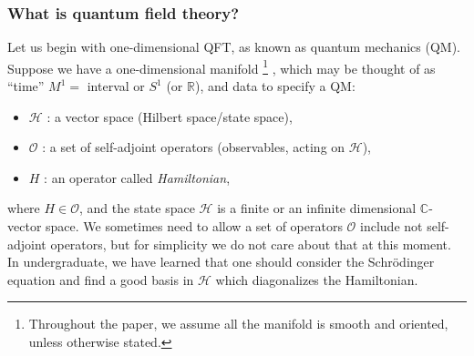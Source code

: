 \subsubsection{What is quantum field theory?}
\label{sec:what_is_qft}

Let us begin with one-dimensional QFT, as known as quantum mechanics
(QM). Suppose we have a one-dimensional manifold%
%
\footnote{Throughout the paper, we assume all the manifold is smooth and oriented,
unless otherwise stated. }%
%
, which may be thought of as ``time'' $M^{1}=$ interval or $S^{1}$
(or $\mathbb{R}$), and data to specify a QM:
\begin{itemize}
  \item $\mathcal{H}$ : a vector space (Hilbert space/state space),
  \item $\mathcal{O}$ : a set of self-adjoint operators (observables, acting on $\mathcal{H}$),
  \item $H$ : an operator called \emph{Hamiltonian},
\end{itemize}
where $H\in\mathcal{O}$, and the state space $\mathcal{H}$ is a finite
or an infinite dimensional $\mathbb{C}$-vector space. We sometimes need
to allow a set of operators $\mathcal{O}$ include not self-adjoint
operators, but for simplicity we do not care about that at this moment.
In undergraduate, we have learned that one should consider the Schr\"{o}dinger
equation and find a good basis in $\mathcal{H}$ which diagonalizes the
Hamiltonian.

